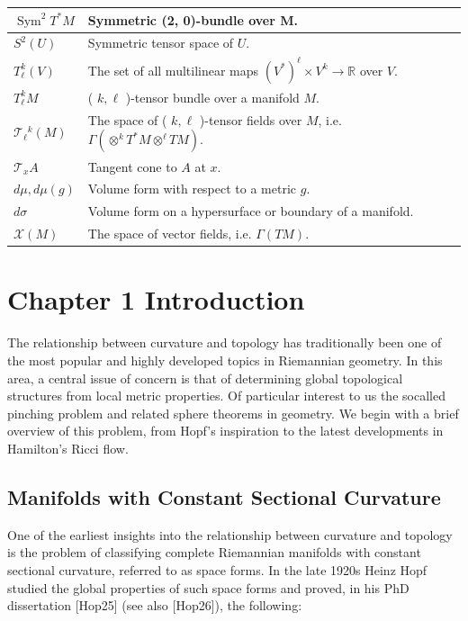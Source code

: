 \documentclass[10pt, letterpaper]{article}
\begin{document}
\begin{center}
\begin{tabular}{|l|l|}
\hline
$\operatorname{Sym}^{2} T^{*} M$ & Symmetric (2, 0)-bundle over M. \\
\hline
$S^{2}(U)$ & Symmetric tensor space of $U$. \\
\hline
$T_{\ell}^{k}(V)$ & The set of all multilinear maps $\left(V^{*}\right)^{\ell} \times V^{k} \rightarrow \mathbb{R}$ over $V$. \\
\hline
$T_{\ell}^{k} M$ & ( $k, \ell$ )-tensor bundle over a manifold $M$. \\
\hline
$\mathscr{T}_{\ell}{ }^{k}(M)$ & The space of ( $k, \ell$ )-tensor fields over $M$, i.e. $\Gamma\left(\otimes^{k} T^{*} M \otimes^{\ell} T M\right)$. \\
\hline
$\mathcal{T}_{x} A$ & Tangent cone to $A$ at $x$. \\
\hline
$d \mu, d \mu(g)$ & Volume form with respect to a metric $g$. \\
\hline
$d \sigma$ & Volume form on a hypersurface or boundary of a manifold. \\
\hline
$\mathscr{X}(M)$ & The space of vector fields, i.e. $\Gamma(T M)$. \\
\hline
\end{tabular}
\end{center}




\pagebreak

\section{Chapter 1 Introduction}
The relationship between curvature and topology has traditionally been one of the most popular and highly developed topics in Riemannian geometry. In this area, a central issue of concern is that of determining global topological structures from local metric properties. Of particular interest to us the socalled pinching problem and related sphere theorems in geometry. We begin with a brief overview of this problem, from Hopf's inspiration to the latest developments in Hamilton's Ricci flow.

\subsection*{Manifolds with Constant Sectional Curvature}
One of the earliest insights into the relationship between curvature and topology is the problem of classifying complete Riemannian manifolds with constant sectional curvature, referred to as space forms. In the late 1920s Heinz Hopf studied the global properties of such space forms and proved, in his PhD dissertation [Hop25] (see also [Hop26]), the following:
\end{document}
